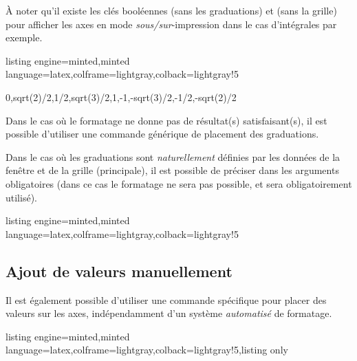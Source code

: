 \documentclass[11pt,a4paper]{ltxdoc}
\begin{document}
À noter qu'il existe les clés booléennes \MontreCode{[Derriere]} (sans les graduations) et \MontreCode{[Devant]} (sans la grille) pour afficher les axes en mode \textit{sous/sur}-impression dans le cas d'intégrales par exemple.

\begin{tcblisting}{listing engine=minted,minted language=latex,colframe=lightgray,colback=lightgray!5}
\begin{GraphiqueTikz}%
	[x=2.75cm,y=3cm,
	Xmin=0,Xmax=3.5,Xgrille=pi/12,Xgrilles=pi/24,
	Ymin=-1.05,Ymax=1.05,Ygrille=0.2,Ygrilles=0.05]
		{0,sqrt(2)/2,1/2,sqrt(3)/2,1,-1,-sqrt(3)/2,-1/2,-sqrt(2)/2}
\end{GraphiqueTikz}
\end{tcblisting}

Dans le cas où le formatage ne donne pas de résultat(s) satisfaisant(s), il est possible d'utiliser une commande générique de placement des graduations.

\pagebreak

Dans le cas où les graduations sont \textit{naturellement} définies par les données de la fenêtre et de la grille (principale), il est possible de préciser  dans les arguments obligatoires (dans ce cas le formatage ne sera pas possible, et  sera obligatoirement utilisé).

\begin{tcblisting}{listing engine=minted,minted language=latex,colframe=lightgray,colback=lightgray!5}
\begin{GraphiqueTikz}%
	[x=1.5cm,y=6cm,Xmin=0,Xmax=7,Xgrille=0.5,Xgrilles=0.25,
	Ymin=0,Ymax=1,Ygrille=0.1,Ygrilles=0.05]
\end{GraphiqueTikz}
\end{tcblisting}

\pagebreak

\subsection{Ajout de valeurs manuellement}\label{ajoutvals}

Il est également possible d'utiliser une commande spécifique pour placer des valeurs sur les axes, indépendamment d'un système \textit{automatisé} de formatage.

\begin{tcblisting}{listing engine=minted,minted language=latex,colframe=lightgray,colback=lightgray!5,listing only}
\end{tcblisting}
\end{document}
